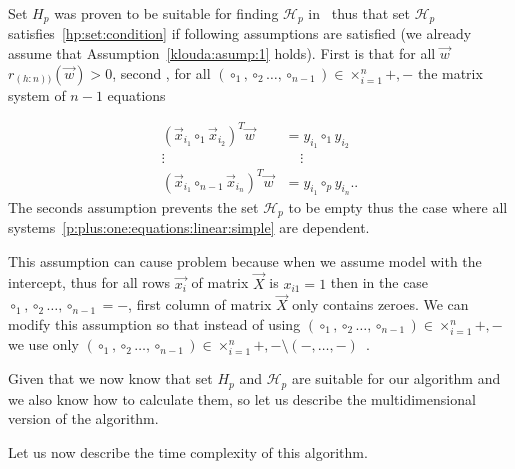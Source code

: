 Set $H_p$ was proven to be suitable for finding $\mathcal{H}_p$ in~\cite{klouda2015exact} thus that set $\mathcal{H}_p$ satisfies~\eqref{hp:set:condition} if following assumptions are satisfied (we already assume that Assumption~\ref{klouda:asump:1} holds). First is that for all $\vec{w}$ $r_{(h:n))}(\vec{w}) > 0$, second , for all 
$(\circ_1,\circ_2 \ldots,  \circ_{n-1}) \in \times^n_{i=1} {+, -}$ the matrix system of $n-1$ equations

\begin{align} 
    (\vec{x}_{i_1} \circ_1 \vec {x}_{i_2} )^T \vec{w} &= y_{i_1} \circ_1 y_{i_2} \label{p:plus:one:equations:linear:simple:to:n}   \\
    \vdots \ \ \  & \ \ \ \  \ \vdots  \nonumber \\ 
    (\vec{x}_{i_1} \circ_{n-1} \vec {x}_{i_{n}} )^T \vec{w} &= y_{i_1} \circ_p y_{i_{n}}. \nonumber.
\end{align}
The seconds assumption prevents the set $\mathcal{H}_p$ to be empty thus the case where all systems~\eqref{p:plus:one:equations:linear:simple} are dependent. 

This assumption can cause problem because when we assume model with the intercept, thus for all rows $\vec{x_i}$ of matrix $\vec{X}$ is $x_{i1} = 1$ then in the case  $\circ_1,\circ_2 \ldots,  \circ_{n-1} = -$, first column of matrix $\vec{X}$ only contains zeroes. We can modify this assumption so that instead of using $(\circ_1,\circ_2 \ldots,  \circ_{n-1}) \in \times^n_{i=1} {+, -}$ we use only $(\circ_1,\circ_2 \ldots,  \circ_{n-1}) \in \times^n_{i=1} {+, -} \setminus {(-, \ldots, -)}$~\cite{klouda2015exact}. 

Given that we now know that set $H_p$ and $\mathcal{H}_p$ are suitable for our algorithm and we also know how to calculate them, so let us describe the multidimensional version of the algorithm.


Let us now describe the time complexity of this algorithm. 

